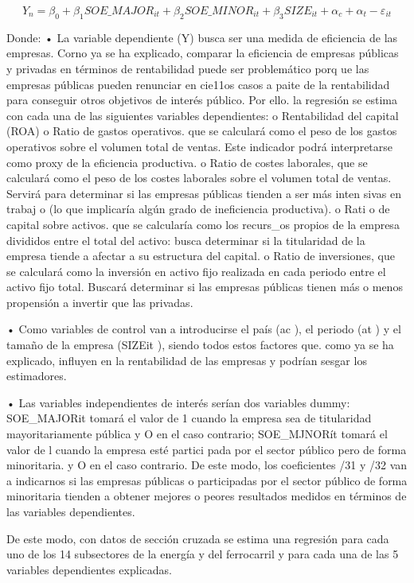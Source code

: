 \documentclass[10pt,a4paper]{article}
\begin{document}
$$Y_n=\beta_0+\beta_1SOE\_MAJOR_{it}+\beta_2SOE\_MINOR_{it}+\beta_3SIZE_{it}+\alpha_c+\alpha_t-\varepsilon_{it}$$

Donde:
• La variable dependiente (Y) busca ser una medida de eficiencia de las empresas. Corno ya se ha explicado, comparar la eficiencia de empresas públicas y privadas en términos de rentabilidad puede ser problemático porq ue las empresas públicas pueden renunciar en cie11os casos a paite de la rentabilidad para conseguir otros objetivos de interés público. Por ello. la regresión se estima con cada una de las siguientes variables dependientes:
o Rentabilidad del capital (ROA)
o Ratio de gastos operativos. que se calculará como el peso de los gastos operativos sobre el volumen total de ventas. Este indicador podrá interpretarse como proxy de la eficiencia productiva.
o Ratio de costes laborales, que se calculará como el peso de los costes laborales sobre el volumen total de ventas. Servirá para determinar si las empresas públicas tienden a ser más inten sivas en trabaj o (lo que implicaría algún grado de ineficiencia productiva).
o Rati o de capital sobre activos. que se calcularía como los recurs_os propios de la empresa divididos entre el total del activo: busca determinar si la titularidad de la empresa tiende a afectar a su estructura del capital.
o Ratio de inversiones, que se calculará como la inversión en activo fijo realizada en cada periodo entre el activo fijo total. Buscará determinar si las empresas públicas tienen más o menos propensión a invertir que las privadas.

• Como variables de control van a introducirse el país (ac ), el periodo (at ) y el tamaño de la empresa (SIZEit ), siendo todos estos factores que. como ya se ha explicado, influyen en la rentabilidad de las empresas y podrían sesgar los estimadores.

• Las variables independientes de interés serían dos variables dummy: SOE_MAJORit tomará el valor de 1 cuando la empresa sea de titularidad mayoritariamente pública y O en el caso contrario; SOE_MJNORít tomará el valor de l cuando la empresa esté partici pada por el sector público pero de forma minoritaria. y O en el caso contrario. De este modo, los coeficientes /31 y /32 van a indicarnos si las empresas públicas o participadas por el sector público de forma minoritaria tienden a obtener mejores o peores resultados medidos en términos de las variables dependientes.

De este modo, con datos de sección cruzada se estima una regresión para cada uno de los 14 subsectores de la energía y del ferrocarril y para cada una de las 5 variables dependientes explicadas.
\end{document}
